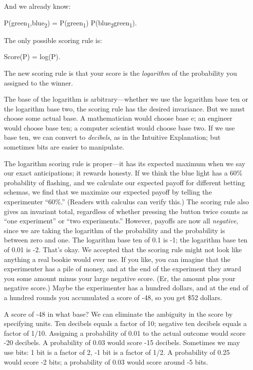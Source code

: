 \bigskip

{
 And we already know:}

{\centering
 P(green\textsubscript{1},blue\textsubscript{2}) =
P(green\textsubscript{1}) {\texttimes}
P(blue\textsubscript{2}{\textbar}green\textsubscript{1}).
\par}


\bigskip

{
 The only possible scoring rule is:}

{\centering
 Score(P) = log(P).
\par}


\bigskip

{
 The new scoring rule is that your score is the \textit{logarithm}
of the probability you assigned to the winner.}

{
 The base of the logarithm is arbitrary---whether we use the
logarithm base ten or the logarithm base two, the scoring rule has the
desired invariance. But we must choose some actual base. A
mathematician would choose base e; an engineer would choose base ten; a
computer scientist would choose base two. If we use base ten, we can
convert to \textit{decibels}, as in the Intuitive Explanation; but
sometimes bits are easier to manipulate.}

{
 The logarithm scoring rule is proper---it has its expected maximum
when we say our exact anticipations; it rewards honesty. If we think
the blue light has a 60\% probability of flashing, and we calculate our
expected payoff for different betting schemas, we find that we maximize
our expected payoff by telling the experimenter
``60\%.'' (Readers with calculus can
verify this.) The scoring rule also gives an invariant total,
regardless of whether pressing the button twice counts as
``one experiment'' or
``two experiments.'' However,
payoffs are now all \textit{negative}, since we are taking the
logarithm of the probability and the probability is between zero and
one. The logarithm base ten of 0.1 is -1; the logarithm base ten of
0.01 is -2. That's okay. We accepted that the scoring
rule might not look like anything a real bookie would ever use. If you
like, you can imagine that the experimenter has a pile of money, and at
the end of the experiment they award you some amount minus your large
negative score. (Er, the amount plus your negative score.) Maybe the
experimenter has a hundred dollars, and at the end of a hundred rounds
you accumulated a score of -48, so you get \$52 dollars.}

{
 A score of -48 in what base? We can eliminate the ambiguity in the
score by specifying units. Ten decibels equals a factor of 10; negative
ten decibels equals a factor of 1/10. Assigning a probability of 0.01
to the actual outcome would score -20 decibels. A probability of 0.03
would score -15 decibels. Sometimes we may use bits: 1 bit is a factor
of 2, -1 bit is a factor of 1/2. A probability of 0.25 would score -2
bits; a probability of 0.03 would score around -5 bits.}


